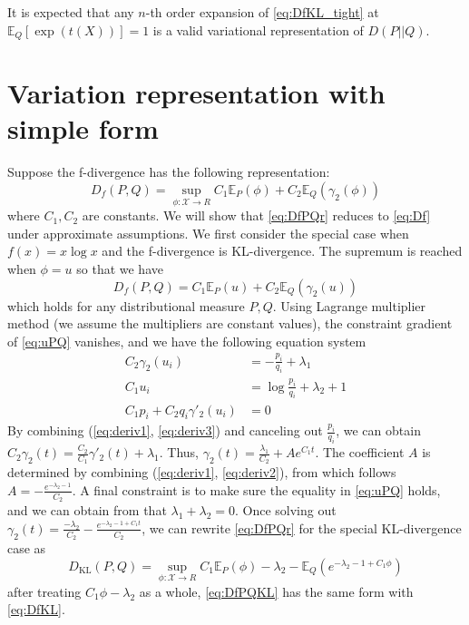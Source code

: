 \documentclass{article}
\theoremstyle{definition}
\begin{document}
It is expected that any $n$-th order expansion of \eqref{eq:DfKL_tight} at $\mathbb{E}_Q[\exp(t(X))]=1$ is a valid variational representation of $D(P||Q)$.

\section{Variation representation with simple form}
Suppose the f-divergence has the following representation:
\begin{equation}\label{eq:DfPQr}
D_f(P,Q) = \sup_{\phi: \mathcal{X} \to R} C_1 \mathbb{E}_P(\phi) + C_2 \mathbb{E}_Q(\gamma_2(\phi))
\end{equation}
where $C_1, C_2$ are constants.
We will show that \eqref{eq:DfPQr} reduces to \eqref{eq:Df} under approximate assumptions.
We first consider the special case when $f(x)=x\log x$ and the f-divergence is KL-divergence.
The supremum is reached when $\phi = u$ so that we have
\begin{equation}\label{eq:uPQ}
D_f(P, Q) = C_1 \mathbb{E}_P(u) + C_2 \mathbb{E}_Q(\gamma_2(u))
\end{equation}
which holds for any distributional measure $P, Q$.
Using Lagrange multiplier method (we assume the multipliers are constant values), the constraint gradient of \eqref{eq:uPQ} vanishes,
and we have the following equation system
\begin{align}
C_2 \gamma_2(u_i) & = -\frac{p_i}{q_i} + \lambda_1 \label{eq:deriv1}\\
C_1 u_i & = \log \frac{p_i}{q_i} + \lambda_2 +1 \label{eq:deriv2}\\
C_1 p_i + C_2 q_i \gamma'_2(u_i) &= 0 \label{eq:deriv3}
\end{align}
By combining (\ref{eq:deriv1}, \ref{eq:deriv3}) and canceling out $\frac{p_i}{q_i}$,
we can obtain $C_2 \gamma_2(t) = \frac{C_2}{C_1} \gamma'_2(t) + \lambda_1$.
Thus, $\gamma_2(t)= \frac{\lambda_1}{C_2} + A e^{C_1 t}$.
The coefficient $A$ is determined by combining (\ref{eq:deriv1}, \ref{eq:deriv2}), from which
follows $A=-\frac{e^{-\lambda_2 - 1}}{C_2}$. A final constraint is to make sure the equality
in \eqref{eq:uPQ} holds, and we can obtain from that $\lambda_1 + \lambda_2 = 0$. 
Once solving out $\gamma_2(t) = \frac{-\lambda_2}{C_2} - \frac{e^{-\lambda_2 -1+ C_1t}}{C_2}$,
we can rewrite \eqref{eq:DfPQr} for the special KL-divergence case as
\begin{equation}\label{eq:DfPQKL}
D_{\textrm{KL}}(P, Q) = \sup_{\phi: \mathcal{X} \to R} C_1 \mathbb{E}_P(\phi) -\lambda_2  - \mathbb{E}_Q(e^{-\lambda_2 -1 + C_1 \phi})
\end{equation}
after treating $C_1 \phi - \lambda_2 $ as a whole, \eqref{eq:DfPQKL} has the same form with
\eqref{eq:DfKL}.
\end{document}
